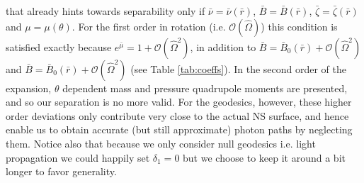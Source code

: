 \documentclass[iop, usenatbib]{emulateapj}
\newcommand{\red}[1]{\textcolor{red}{#1}}
\newcommand{\pd}{\ensuremath{\partial}} %
\newcommand{\rb}{\ensuremath{\bar{r}}}
\newcommand{\wb}{\ensuremath{\bar{\omega}}}
\newcommand{\Ob}{\ensuremath{\hat{\Omega}}}
\newcommand{\nub}{\ensuremath{\bar{\nu}}}
\newcommand{\zetab}{\ensuremath{\bar{\zeta}}}
\newcommand{\Bb}{\ensuremath{\bar{B}}}
\newcommand{\mub}{\ensuremath{\bar{\mu}}}
\begin{document}
that already hints towards separability only if $\nub = \nub(\rb)$, $\Bb = \Bb(\rb)$, $\zetab = \zetab(\rb)$ and $\mu = \mu(\theta)$.
For the first order in rotation (i.e. $\mathcal{O}(\Ob)$) this condition is satisfied exactly because $e^{\mub} = 1 + \mathcal{O}(\Ob^2)$, in addition to $\Bb = \Bb_0(\rb) + \mathcal{O}(\Ob^2)$ and $\Bb = \Bb_0(\rb) + \mathcal{O}(\Ob^2)$ (see Table \ref{tab:coeffs}). 
In the second order of the expansion, $\theta$ dependent mass and pressure quadrupole moments are presented, and so our separation is no more valid.
For the geodesics, however, these higher order deviations only contribute very close to the actual NS surface, and hence enable us to obtain accurate (but still approximate) photon paths by neglecting them.
Notice also that because we only consider null geodesics i.e. light propagation we could happily set $\delta_1 = 0$ but we choose to keep it around a bit longer to favor generality.
\end{document}
